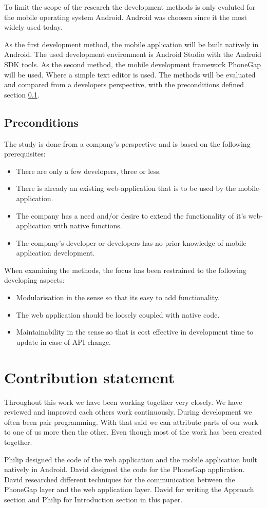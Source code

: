 To limit the scope of the research the development methods is only evaluted for the mobile operating system Android. Android was choosen since it the most widely used today. 

As the first development method, the mobile application will be built natively in Android. The used development environment is Android Studio with the Android SDK tools. As the second method, the mobile development framework PhoneGap will be used. Where a simple text editor is used. The methods will be evaluated and compared from a developers perspective, with the preconditions defined section \ref{section-preconditions}.

\subsection{Preconditions} \label{section-preconditions}
The study is done from a company's perspective and is based on the following prerequisites:
\begin{itemize}
\item There are only a few developers, three or less.
\item There is already an existing web-application that is to be used by the mobile-application.
\item The company has a need and/or desire to extend the functionality of it's web-application with native functions.
\item The company's developer or developers has no prior knowledge of mobile application development.
\end{itemize}

When examining the methods, the focus has been restrained to the following developing aspects:
\begin{itemize}
\item Modularisation in the sense so that its easy to add functionality.
\item The web application should be loosely coupled with native code.
\item Maintainability in the sense so that is cost effective in development time to update in case of API change.
\end{itemize}
\section{Contribution statement}
Throughout this work we have been working together very closely. We have reviewed and improved each others work continuously. During development we often been pair programming. With that said we can attribute parts of our work to one of us more then the other. Even though most of the work has been created together. 

Philip designed the code of the web application and the mobile application built natively in Android. David designed the code for the PhoneGap application. David researched different techniques for the communication between the PhoneGap layer and the web application layer. David for writing the Approach section and Philip for Introduction section in this paper. 
